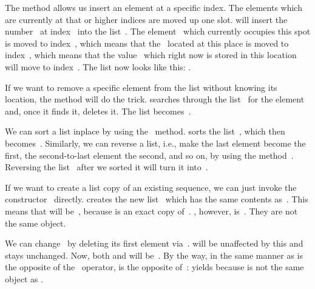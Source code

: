 The  method allows us insert an element at a specific index.
The elements which are currently at that or higher indices are moved up one slot.
 will insert the number~ at index~ into the list~.
The element~ which currently occupies this spot is moved to index~, which means that the~ located at this place is moved to index~, which means that the value~ which right now is stored in this location will move to index~.
The list  now looks like this: \pythonil{[1, 7, 12, 56, 2, 4]}.

If we want to remove a specific element from the list without knowing its location, the  method will do the trick.
 searches through the list~ for the element~ and, once it finds it, deletes it.
The list becomes~\pythonil{[1, 7, 12, 2, 4]}.

We can sort a list inplace by using the~ method.
 sorts the list~, which then becomes~\pythonil{[1, 2, 4, 7, 12]}.
Similarly, we can reverse a list, i.e., make the last element become the first, the second-to-last element the second, and so on, by using the method~.
Reversing the list~ after we sorted it will turn it into~\pythonil{[12, 7, 4, 2, 1]}.

If we want to create a list copy of an existing sequence, we can just invoke the constructor~ directly.
 creates the new list~ which has the same contents as~.
This means that  will be~, because  is an exact copy of~.
, however, is~.
They are not the same object.

We can change~ by deleting its first element via~.
 will be unaffected by this and stays unchanged.
Now, both \pythonIdx{==} and  will be~.
By the way, in the same manner as  is the opposite of the ~operator,  is the opposite of~:
 yields  because  is not the same object as .

